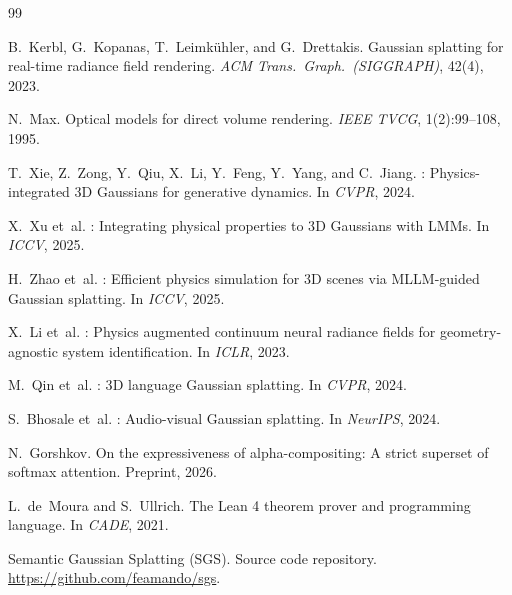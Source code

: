 \documentclass[twoside,11pt]{article}
\begin{document}

\begin{thebibliography}{99}

B.~Kerbl, G.~Kopanas, T.~Leimk{\"u}hler, and G.~Drettakis.
 {G}aussian splatting for real-time radiance field rendering.
\newblock \emph{ACM Trans.\ Graph.\ (SIGGRAPH)}, 42(4), 2023.

N.~Max.
\newblock Optical models for direct volume rendering.
\newblock \emph{IEEE TVCG}, 1(2):99--108, 1995.

T.~Xie, Z.~Zong, Y.~Qiu, X.~Li, Y.~Feng, Y.~Yang, and C.~Jiang.
: Physics-integrated 3{D} {G}aussians for generative dynamics.
\newblock In \emph{CVPR}, 2024.

X.~Xu et~al.
: Integrating physical properties to 3{D} {G}aussians with {LMM}s.
\newblock In \emph{ICCV}, 2025.

H.~Zhao et~al.
: Efficient physics simulation for 3{D} scenes via {MLLM}-guided {G}aussian splatting.
\newblock In \emph{ICCV}, 2025.

X.~Li et~al.
: Physics augmented continuum neural radiance fields for geometry-agnostic system identification.
\newblock In \emph{ICLR}, 2023.

M.~Qin et~al.
: 3{D} language {G}aussian splatting.
\newblock In \emph{CVPR}, 2024.

S.~Bhosale et~al.
: Audio-visual {G}aussian splatting.
\newblock In \emph{NeurIPS}, 2024.

N.~Gorshkov.
\newblock On the expressiveness of alpha-compositing: A strict superset of softmax attention.
\newblock Preprint, 2026.

L.~de~Moura and S.~Ullrich.
\newblock The {L}ean 4 theorem prover and programming language.
\newblock In \emph{CADE}, 2021.

Semantic {G}aussian {S}platting (SGS).
\newblock Source code repository.
\newblock \url{https://github.com/feamando/sgs}.

\end{thebibliography}
\end{document}
